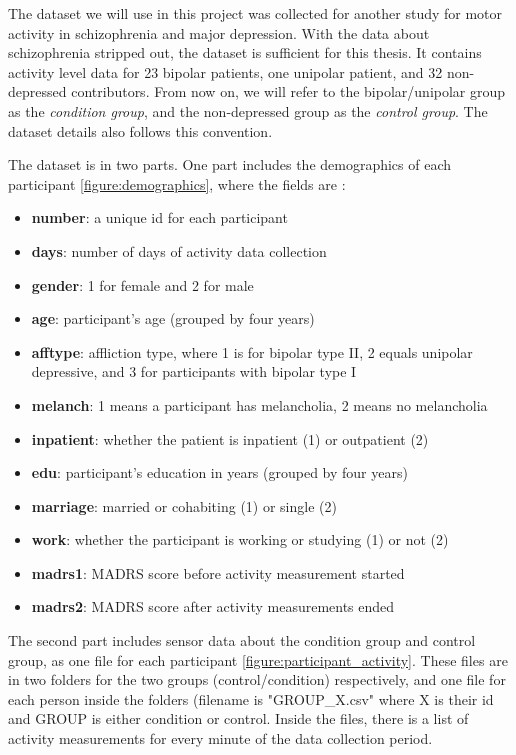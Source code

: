 The dataset we will use in this project \cite{dataset} was collected for another study for motor activity in schizophrenia and major depression. With the data about schizophrenia stripped out, the dataset is sufficient for this thesis. It contains activity level data for 23 bipolar patients, one unipolar patient, and 32 non-depressed contributors. From now on, we will refer to the bipolar/unipolar group as the \textit{condition group}, and the non-depressed group as the \textit{control group}. The dataset details \cite{dataset_details} also follows this convention.

The dataset is in two parts. One part includes the demographics of each participant \ref{figure:demographics}, where the fields are \cite{dataset_details}:

\begin{itemize}
    \item \textbf{number}: a unique id for each participant
    \item \textbf{days}: number of days of activity data collection 
    \item \textbf{gender}: 1 for female and 2 for male
    \item \textbf{age}: participant's age (grouped by four years)
    \item \textbf{afftype}: affliction type, where 1 is for bipolar type II, 2 equals unipolar depressive, and 3 for participants with bipolar type I
    \item \textbf{melanch}: 1 means a participant has melancholia, 2 means no melancholia
    \item \textbf{inpatient}: whether the patient is inpatient (1) or outpatient (2)
    \item \textbf{edu}: participant's education in years (grouped by four years)
    \item \textbf{marriage}: married or cohabiting (1) or single (2)
    \item \textbf{work}: whether the participant is working or studying (1) or not (2)
    \item \textbf{madrs1}: MADRS score before activity measurement started
    \item \textbf{madrs2}: MADRS score after activity measurements ended
\end{itemize}

The second part includes sensor data about the condition group and control group, as one file for each participant \ref{figure:participant_activity}. These files are in two folders for the two groups (control/condition) respectively, and one file for each person inside the folders (filename is "GROUP\_X.csv" where X is their id and GROUP is either condition or control. Inside the files, there is a list of activity measurements for every minute of the data collection period.


